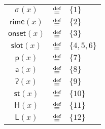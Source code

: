\begin{figure}[ht]
\begin{tabular}{|ccl|}
		\hline
		$\mathsf{\sigma}(x)$ & $\stackrel{\text{def}}{=}$ &  $\{1\}$ \\
		$\mathsf{rime}(x)$ & $\stackrel{\text{def}}{=}$ &  $\{2\}$ \\
		$\mathsf{onset}(x)$ & $\stackrel{\text{def}}{=}$ &  $\{3\}$ \\
		$\mathsf{slot}(x)$ & $\stackrel{\text{def}}{=}$ & $ \{4,5,6\}$ \\
		\hline
		$\mathsf{p}(x)$ & $\stackrel{\text{def}}{=}$ & $\{7\}$\\
		${\mathsf{a}}(x)$ & $\stackrel{\text{def}}{=}$ & $\{8\}$ \\
		${\mathsf{ʔ}}(x)$ & $\stackrel{\text{def}}{=}$ & $\{9\}$ \\
		${\mathsf{st}}(x)$ & $\stackrel{\text{def}}{=}$ & $\{10\}$\\
		${\mathsf{H}}(x)$ & $\stackrel{\text{def}}{=}$ & $\{11\}$ \\
		${\mathsf{L}}(x)$ & $\stackrel{\text{def}}{=}$ & $\{12\}$ \\
		\hline
	\end{tabular}
\end{figure}


